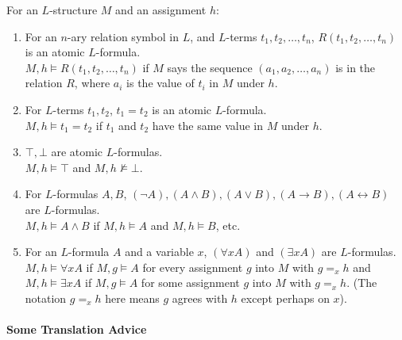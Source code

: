 \documentclass[10pt,twoside,twocolumn]{article}
\begin{document}
For an $L$-structure $M$ and an assignment $h$:
\begin{enumerate}
\item For an $n$-ary relation symbol in $L$, and $L$-terms $t_{1},t_{2},\dots,t_{n}$,
$R\left(t_{1},t_{2},\dots,t_{n}\right)$ is an atomic $L$-formula.\\
$M,h\vDash R\left(t_{1},t_{2},\dots,t_{n}\right)$ if $M$ says the
sequence $\left(a_{1},a_{2},\dots,a_{n}\right)$ is in the relation
$R$, where $a_{i}$ is the value of $t_{i}$ in $M$ under $h$.
\item For $L$-terms $t_{1},t_{2}$, $t_{1}=t_{2}$ is an atomic $L$-formula.\\
$M,h\vDash t_{1}=t_{2}$ if $t_{1}$ and $t_{2}$ have the same value
in $M$ under $h$.
\item $\top,\bot$ are atomic $L$-formulas.\\
$M,h\vDash\top$ and $M,h\not\vDash\bot$.
\item For $L$-formulas $A,B$, $\left(\lnot A\right),\left(A\land B\right),\left(A\lor B\right),\left(A\rightarrow B\right),\left(A\leftrightarrow B\right)$
are $L$-formulas.\\
$M,h\vDash A\land B$ if $M,h\vDash A$ and $M,h\vDash B$, etc.
\item For an $L$-formula $A$ and a variable $x$, $\left(\forall xA\right)$
and $\left(\exists xA\right)$ are $L$-formulas.\\
$M,h\vDash\forall xA$ if $M,g\vDash A$ for every assignment $g$
into $M$ with $g=_{x}h$ and $M,h\vDash\exists xA$ if $M,g\vDash A$
for some assignment $g$ into $M$ with $g=_{x}h$. (The notation
$g=_{x}h$ here means $g$ agrees with $h$ except perhaps on $x$).
\end{enumerate}

\paragraph{Some Translation Advice}
\end{document}
